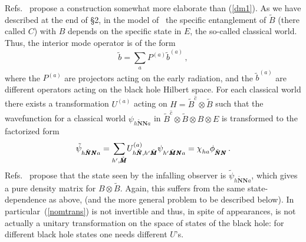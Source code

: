 \documentclass[12pt]{article}
\newcommand{\be}{\begin{equation}}
\newcommand{\ee}{\end{equation}}
\begin{document}
{Refs.~\cite{Nomura:2012sw,Nomura3} propose a construction somewhat more elaborate than (\ref{dm1}).  As we have described at the end of \S2, in the model of~\cite{Nomura3} the specific entanglement of $\tilde B$ (there called $C$) with $B$ depends on the specific state in $E$, the so-called classical world.  Thus, the interior mode operator is of the form
\be
\tilde b = \sum_a P^{(a)} \tilde b^{(a)} \,,
\ee
where the $P^{(a)}$ are projectors acting on the early radiation, and the $\tilde b^{(a)}$ are different operators acting on the black hole Hilbert space.  For each classical world there exists a  transformation $U^{(a)}$ acting on $H = \tilde B^{\hat c} \otimes \tilde B$ such that the wavefunction for a classical world $\psi_{h \tilde{\pmb N} {\pmb N} a}$ in $\tilde B^{\hat c} \otimes \tilde B\otimes B \otimes E$ is transformed to the factorized form
\be
\tilde \psi_{h \tilde{\pmb N} {\pmb N} a}^{\vphantom{(a)}} = {\sum_{ h' , \tilde{\pmb M}}} U^{(a)}_{h \tilde{\pmb N},h' \tilde{\pmb M}} \psi_{h' \tilde{\pmb M} {\pmb N} a}^{\vphantom{(a)}}  = \chi_{ha}^{\vphantom{(a)}}  \phi_{ \tilde{\pmb N} {\pmb N} }^{\vphantom{(a)}}  \, .  \label{nomtrans}
\ee
Refs.~\cite{Nomura:2012sw,Nomura3} propose that the state seen by the infalling observer is $\tilde \psi_{h \tilde{\pmb N} {\pmb N} a}$, which gives a pure density matrix for $B\otimes \tilde B$.
Again, this suffers from the same state-dependence as above, (and the more general problem to be described below).  {In particular~(\ref{nomtrans}) is not invertible and thus, in spite of appearances, is not actually a unitary} transformation on the space of states of the black hole:  for different black hole states one needs different $U$'s.






}
\end{document}
